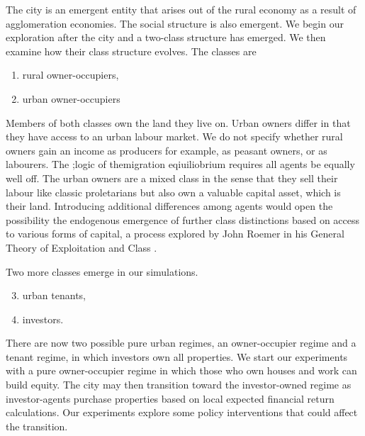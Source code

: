 The city is an emergent entity that arises out of the rural economy as a result of agglomeration economies. The social structure is also emergent. We begin our exploration after the city and a two-class structure has emerged. We then examine how their class structure evolves. The classes are
\begin{enumerate}
    \item rural owner-occupiers,
    \item  urban owner-occupiers 
\end{enumerate}
Members of both classes own the land they live on. Urban owners differ in that they have access to an urban labour market. We do not specify whether rural owners gain an income as producers for example, as peasant owners, or as labourers. The ;logic of themigration eqiuiliobrium requires all agents be equally well off. The urban owners are a mixed class in the sense that they sell their labour like classic proletarians but also own a valuable capital asset, which is their land. Introducing additional differences among agents would open the possibility  the endogenous emergence of further \gls{class} distinctions based on access to various forms of capital, a process explored by John Roemer in his General Theory of Exploitation and Class \cite{roemerGeneralTheoryExploitation1982}.

Two more classes emerge in our simulations.
 \begin{enumerate}    \setcounter{enumi}{2}
    \item urban tenants,
    \item investors. 
\end{enumerate}
There are now two possible pure urban regimes, an owner-occupier regime and a tenant regime, in which investors own all properties. We start our experiments with a pure owner-occupier regime in which those who own houses and work can build equity.  The city may then transition toward the investor-owned regime as investor-agents purchase properties based on local expected financial return calculations. Our experiments explore some policy interventions that could affect the transition.






